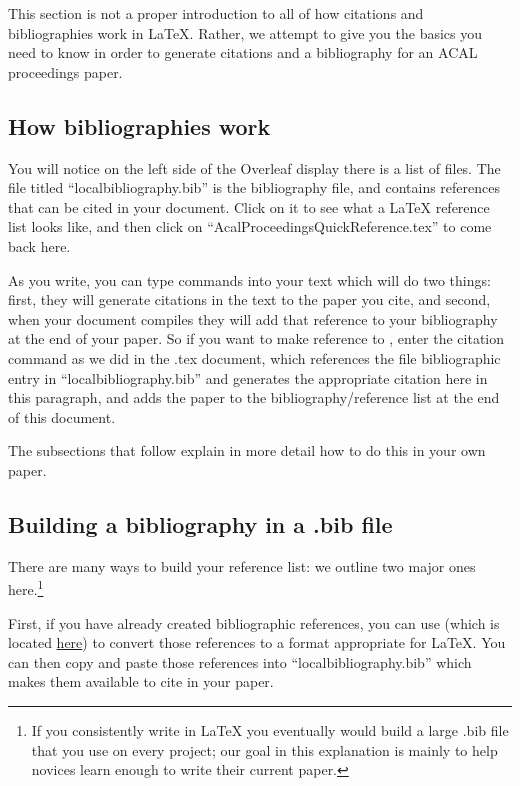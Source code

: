 \documentclass[output=paper,colorlinks,citecolor=brown,
]{langscibook}
\begin{document}
This section is not a proper introduction to all of how citations and bibliographies work in \LaTeX{}. Rather, we attempt to give you the basics you need to know in order to generate citations and a bibliography for an ACAL proceedings paper. 

\subsection{How bibliographies work}

You will notice on the left side of the Overleaf display there is a list of files. The file titled ``localbibliography.bib'' is the bibliography file, and contains references that can be cited in your document. Click on it to see what a \LaTeX{} reference list looks like, and then click on ``AcalProceedingsQuickReference.tex'' to come back here. 

As you write, you can type commands into your text which will do two things: first, they will generate citations in the text to the paper you cite, and second, when your document compiles they will add that reference to your bibliography at the end of your paper. So if you want to make reference to \citet{BresnanMchombo1987ChichewaSmOm}, enter the citation command as we did in the .tex document, which references the file bibliographic entry in ``localbibliography.bib'' and generates the appropriate citation here in this paragraph, and adds the \citeauthor{BresnanMchombo1987ChichewaSmOm} paper to the bibliography/reference list at the end of this document.

The subsections that follow explain in more detail how to do this in your own paper. 

\subsection{Building a bibliography in a .bib file}

There are many ways to build your reference list: we outline two major ones here.\footnote{If you consistently write in \LaTeX{} you eventually would build a large .bib file that you use on every project; our goal in this explanation is mainly to help novices learn enough to write their current paper.}

First, if you have already created bibliographic references, you can use \citet{Nordhoff2018} (which is located \href{http://glottotopia.org/doc2tex/doc2bib}{here}) to convert those references to a format appropriate for \LaTeX{}. You can then copy and paste those references into ``localbibliography.bib'' which makes them available to cite in your paper.
\end{document}
